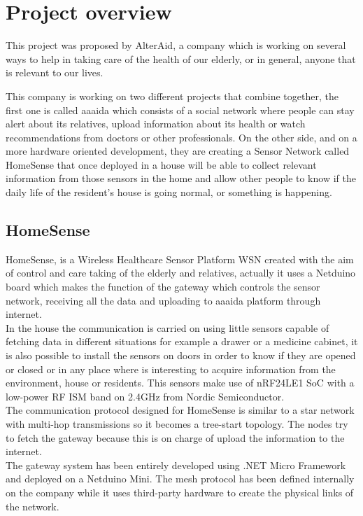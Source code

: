 \chapter{Project overview}\label{C:project-overview}
This project was proposed by AlterAid, a company which is working on several ways to help in taking care of the health of our elderly, or in general, anyone that is relevant to our lives.

This company is working on two different projects that combine together, the first one is called aaaida which consists of a social network where people can stay alert about its relatives, upload information about its health or watch recommendations from doctors or other professionals. On the other side, and on a more hardware oriented development, they are creating a Sensor Network called HomeSense that once deployed in a house will be able to collect relevant information from those sensors in the home and allow other people to know if the daily life of the resident's house is going normal, or something is happening.

\section{HomeSense}\label{S:HomeSense}
HomeSense, is a Wireless Healthcare Sensor Platform \gls{WSN} created with the aim of control and care taking of the elderly and relatives, actually it uses a Netduino board which makes the function of the gateway which controls the sensor network, receiving all the data and uploading to aaaida platform through internet.
\\
In the house the communication is carried on using little sensors capable of fetching data in different situations for example a drawer or a medicine cabinet, it is also possible to install the sensors on doors in order to know if they are opened or closed or in any place where is interesting to acquire information from the environment, house or residents. This sensors make use of nRF24LE1 \gls{SoC} with a low-power RF \gls{ISM} band on 2.4GHz from Nordic Semiconductor.
\\
The communication protocol designed for HomeSense is similar to a star network with multi-hop transmissions so it becomes a tree-start topology. The nodes try to fetch the gateway because this is on charge of upload the information to the internet.
\\
The gateway system has been entirely developed using .NET Micro Framework and deployed on a Netduino Mini. The mesh protocol has been defined internally on the company while it uses third-party hardware to create the physical links of the network.

